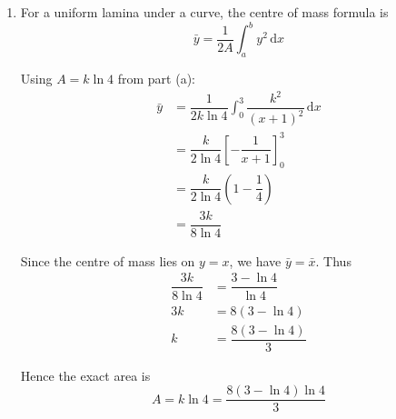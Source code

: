 \documentclass[leqno]{article}
\begin{document}
\begin{enumerate}[
  label=\textbf{\arabic*.},
  leftmargin=*,
  topsep=0pt,
  partopsep=0pt,
  parsep=0pt
]
\begin{djsSolution}
\begin{enumerate}[label=\textbf{(\alph*)}, start=1]
Using \(\frac{x}{x+1}=1-\frac{1}{x+1}\):
\begin{align*}
\int_0^3 xy\,\mathrm{d}x
&=k\int_0^3\dfrac{x}{x+1}\,\mathrm{d}x\\
&=k\int_0^3\left(1-\dfrac{1}{x+1}\right)\,\mathrm{d}x\\
&=k\left[x-\ln(x+1)\right]_0^3\\
&=k(3-\ln4)
\end{align*}

Therefore
\[
\bar{x}=\dfrac{k(3-\ln4)}{k\ln4}
=\dfrac{3-\ln4}{\ln4}
\]

\item For a uniform lamina under a curve, the centre of mass formula is
\[
\bar{y}=\frac{1}{2A}\int_a^b y^2\,\mathrm{d}x
\]

Using \(A=k\ln4\) from part (a):
\begin{align*}
\bar{y}
&=\dfrac{1}{2k\ln4}\int_0^3\dfrac{k^2}{(x+1)^2}\,\mathrm{d}x\\
&=\dfrac{k}{2\ln4}\left[-\dfrac{1}{x+1}\right]_0^3\\
&=\dfrac{k}{2\ln4}\left(1-\dfrac14\right)\\
&=\dfrac{3k}{8\ln4}
\end{align*}

Since the centre of mass lies on \(y=x\), we have \(\bar{y}=\bar{x}\). Thus
\begin{align*}
\dfrac{3k}{8\ln4}&=\dfrac{3-\ln4}{\ln4}\\
3k&=8(3-\ln4)\\
k&=\dfrac{8(3-\ln4)}{3}
\end{align*}

Hence the exact area is
\[
A=k\ln4=\dfrac{8(3-\ln4)\ln4}{3}
\]

\end{enumerate}
\end{djsSolution}

\newpage

\questionitem


\end{enumerate}
\end{document}

